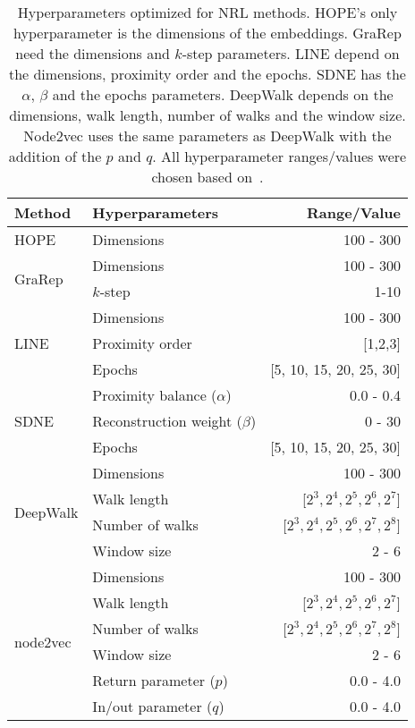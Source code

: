 \begin{table}[!ht]
    \centering
    \begin{tabular}{ |l|l|r| }
        \hline
        \textbf{Method} & \textbf{Hyperparameters} & \textbf{Range/Value} \\
        \hline
        HOPE & Dimensions & 100 - 300 \\
        \hline
        \multirow{2}{5em}{GraRep} & Dimensions & 100 - 300 \\
        & $k$-step & 1-10 \\
        \hline
        \multirow{3}{4em}{LINE} & Dimensions & 100 - 300 \\
        & Proximity order & [1,2,3] \\
        & Epochs & [5, 10, 15, 20, 25, 30] \\
        \hline
        \multirow{3}{5em}{SDNE} & Proximity balance ($\alpha$) & 0.0 - 0.4 \\
        & Reconstruction weight ($\beta$) & 0 - 30 \\
        & Epochs & [5, 10, 15, 20, 25, 30] \\
        \hline
        \multirow{4}{5em}{DeepWalk} & Dimensions & 100 - 300 \\
        & Walk length & [$2^3, 2^4, 2^5, 2^6, 2^7$] \\
        & Number of walks & [$2^3, 2^4, 2^5, 2^6, 2^7, 2^8$] \\
        & Window size & 2 - 6 \\
        \hline
        \multirow{6}{5em}{node2vec} & Dimensions & 100 - 300 \\
        & Walk length & [$2^3, 2^4, 2^5, 2^6, 2^7$] \\
        & Number of walks & [$2^3, 2^4, 2^5, 2^6, 2^7, 2^8$] \\
        & Window size & 2 - 6 \\
        & Return parameter ($p$) & 0.0 - 4.0 \\
        & In/out parameter ($q$) & 0.0 - 4.0 \\
        \hline
    \end{tabular}
    \caption[Hyperparameters optimized for network representation learning methods]{Hyperparameters optimized for \ac{NRL} methods. HOPE's only hyperparameter is the dimensions of the embeddings. GraRep need the dimensions and $k$-step parameters. LINE depend on the dimensions, proximity order and the epochs. SDNE has the $\alpha$, $\beta$ and the epochs parameters. DeepWalk depends on the dimensions, walk length, number of walks and the window size. Node2vec uses the same parameters as DeepWalk with the addition of the $p$ and $q$. All hyperparameter ranges/values were chosen based on~\cite{yue_graph_2019}.}
    \label{tab:hyperparameters}
\end{table}

